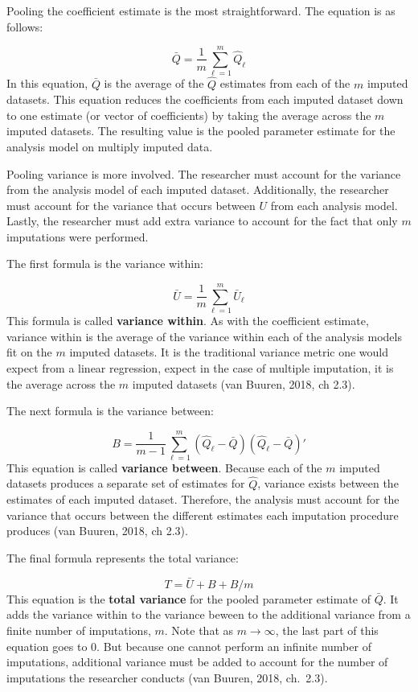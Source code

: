 \documentclass[12pt,oneside]{chicagocapstone}
\begin{document}
Pooling the coefficient estimate is the most straightforward. The
equation is as follows:

\[\bar Q = \frac{1}{m}\sum_{\ell=1}^m \hat Q_\ell\] In this equation,
\(\bar Q\) is the average of the \(\hat Q\) estimates from each of the
\(m\) imputed datasets. This equation reduces the coefficients from each
imputed dataset down to one estimate (or vector of coefficients) by
taking the average across the \(m\) imputed datasets. The resulting
value is the pooled parameter estimate for the analysis model on
multiply imputed data.

Pooling variance is more involved. The researcher must account for the
variance from the analysis model of each imputed dataset. Additionally,
the researcher must account for the variance that occurs between \(U\)
from each analysis model. Lastly, the researcher must add extra variance
to account for the fact that only \(m\) imputations were performed.

The first formula is the variance within:

\[ \bar U = \frac{1}{m}\sum_{\ell=1}^m \bar U_\ell\] This formula is
called \textbf{variance within}. As with the coefficient estimate,
variance within is the average of the variance within each of the
analysis models fit on the \(m\) imputed datasets. It is the traditional
variance metric one would expect from a linear regression, expect in the
case of multiple imputation, it is the average across the \(m\) imputed
datasets (van Buuren, 2018, ch 2.3).

The next formula is the variance between:

\[B = \frac{1}{m-1}\sum_{\ell=1}^m (\hat Q_\ell-\bar Q)(\hat Q_\ell-\bar Q)'\]
This equation is called \textbf{variance between}. Because each of the
\(m\) imputed datasets produces a separate set of estimates for
\(\hat Q\), variance exists between the estimates of each imputed
dataset. Therefore, the analysis must account for the variance that
occurs between the different estimates each imputation procedure
produces (van Buuren, 2018, ch 2.3).

The final formula represents the total variance:

\[T = \bar U + B + B/m\] This equation is the \textbf{total variance}
for the pooled parameter estimate of \(\bar Q\). It adds the variance
within to the variance beween to the additional variance from a finite
number of imputations, \(m\). Note that as \(m \rightarrow \infty\), the
last part of this equation goes to \(0\). But because one cannot perform
an infinite number of imputations, additional variance must be added to
account for the number of imputations the researcher conducts (van
Buuren, 2018, ch.~2.3).
\end{document}
